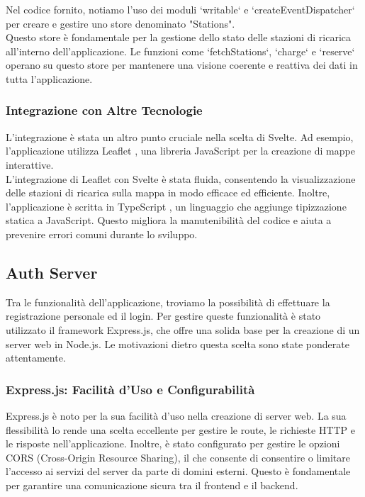 Nel codice fornito, notiamo l'uso dei moduli `writable` e `createEventDispatcher` per
creare e gestire uno store denominato "Stations".\\

Questo store è fondamentale per la gestione dello stato delle stazioni di ricarica
all'interno dell'applicazione. Le funzioni come `fetchStations`, `charge` e `reserve` operano
su questo store per mantenere una visione coerente e reattiva dei dati in tutta l'applicazione.

\subsubsection{Integrazione con Altre Tecnologie}

L'integrazione è stata un altro punto cruciale nella scelta di Svelte. Ad esempio,
l'applicazione utilizza Leaflet \cite{leaflet}, una libreria JavaScript per la creazione
di mappe interattive. \\

L'integrazione di Leaflet con Svelte è stata fluida, consentendo la visualizzazione
delle stazioni di ricarica sulla mappa in modo efficace ed efficiente. Inoltre,
l'applicazione è scritta in TypeScript \cite{typescript}, un linguaggio che aggiunge
tipizzazione statica a JavaScript. Questo migliora la manutenibilità del codice e aiuta
a prevenire errori comuni durante lo sviluppo.

\subsection{Auth Server}

Tra le funzionalità dell'applicazione, troviamo la possibilità di effettuare la registrazione
personale ed il login. Per gestire queste funzionalità è stato utilizzato il framework Express.js,
che offre una solida base per la creazione di un server web in Node.js. Le motivazioni dietro
questa scelta sono state ponderate attentamente.

\subsubsection{Express.js: Facilità d'Uso e Configurabilità}

Express.js è noto per la sua facilità d'uso nella creazione di server web. La sua
flessibilità lo rende una scelta eccellente per gestire le route, le richieste HTTP e
le risposte nell'applicazione. Inoltre, è stato configurato per gestire le opzioni CORS \cite{cors}
(Cross-Origin Resource Sharing), il che consente di consentire o limitare l'accesso ai
servizi del server da parte di domini esterni. Questo è fondamentale per garantire una
comunicazione sicura tra il frontend e il backend.

